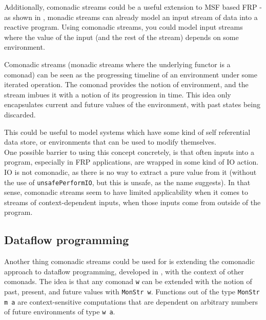 Additionally, comonadic streams could be a useful extension to MSF based FRP - as shown in \cite{frp_refactored}, monadic streams can already model an input stream of data into a reactive program. Using comonadic streams, you could model input streams where the value of the input (and the rest of the stream) depends on some environment. 

Comonadic streams (monadic streams where the underlying functor is a comonad) can be seen as the progressing timeline of an environment under some iterated operation. The comonad provides the notion of environment, and the stream imbues it with a notion of its progression in time. This idea only encapsulates current and future values of the environment, with past states being discarded.

This could be useful to model systems which have some kind of self referential data store, or environments that can be used to modify themselves. \\

One possible barrier to using this concept concretely, is that often inputs into a program, especially in FRP applications, are wrapped in some kind of IO action. IO is not comonadic, as there is no way to extract a pure value from it (without the use of \verb+unsafePerformIO+, but this is unsafe, as the name suggests). In that sense, comonadic streams seem to have limited applicability when it comes to streams of context-dependent inputs, when those inputs come from outside of the program.


\subsection{Dataflow programming}

Another thing comonadic streams could be used for is extending the comonadic approach to dataflow programming, developed in \cite{essence_of_dataflow}, with the context of other comonads. The idea is that any comonad \verb+w+ can be extended with the notion of past, present, and future values with \verb+MonStr w+. Functions out of the type \verb+MonStr m a+ are context-sensitive computations that are dependent on arbitrary numbers of future environments of type \verb+w a+.
